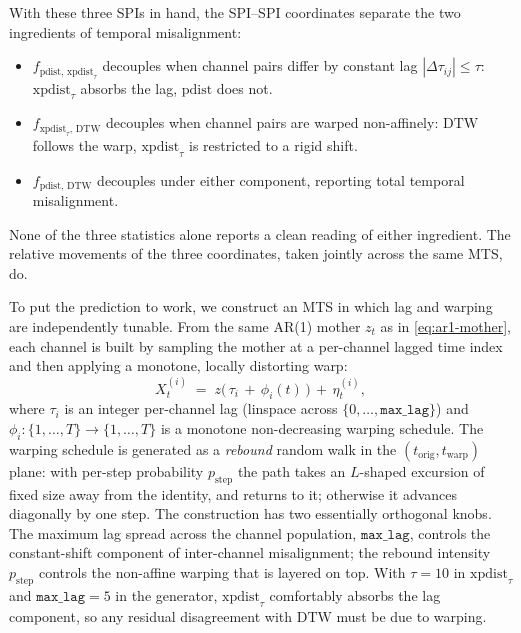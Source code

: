 \documentclass{article}
\theoremstyle{plain}
\theoremstyle{definition}
\theoremstyle{remark}
\begin{document}
With these three SPIs in hand, the SPI--SPI coordinates separate the two ingredients of temporal misalignment:
\begin{itemize}
\setlength{\itemsep}{0pt}\setlength{\parsep}{0pt}
\item[] $f_{\mathrm{pdist},\,\mathrm{xpdist}_\tau}$ decouples when channel pairs differ by constant lag $|\Delta\tau_{ij}| \le \tau$: $\mathrm{xpdist}_\tau$ absorbs the lag, $\mathrm{pdist}$ does not.
\item[] $f_{\mathrm{xpdist}_\tau,\,\mathrm{DTW}}$ decouples when channel pairs are warped non-affinely: $\mathrm{DTW}$ follows the warp, $\mathrm{xpdist}_\tau$ is restricted to a rigid shift.
\item[] $f_{\mathrm{pdist},\,\mathrm{DTW}}$ decouples under either component, reporting total temporal misalignment.
\end{itemize}
None of the three statistics alone reports a clean reading of either ingredient. The relative movements of the three coordinates, taken jointly across the same MTS, do.

To put the prediction to work, we construct an MTS in which lag and warping are independently tunable. From the same AR(1) mother $z_t$ as in \cref{eq:ar1-mother}, each channel is built by sampling the mother at a per-channel lagged time index and then applying a monotone, locally distorting warp:
\begin{equation}
X^{(i)}_t \;=\; z\bigl(\,\tau_i \,+\, \phi_i(t)\,\bigr) \,+\, \eta^{(i)}_t,
\end{equation}
where $\tau_i$ is an integer per-channel lag (linspace across $\{0,\dots,\texttt{max\_lag}\}$) and $\phi_i:\{1,\dots,T\}\to\{1,\dots,T\}$ is a monotone non-decreasing warping schedule. The warping schedule is generated as a \emph{rebound} random walk in the $(t_{\text{orig}},t_{\text{warp}})$ plane: with per-step probability $p_{\text{step}}$ the path takes an $L$-shaped excursion of fixed size away from the identity, and returns to it; otherwise it advances diagonally by one step. The construction has two essentially orthogonal knobs. The maximum lag spread across the channel population, $\texttt{max\_lag}$, controls the constant-shift component of inter-channel misalignment; the rebound intensity $p_{\text{step}}$ controls the non-affine warping that is layered on top. With $\tau=10$ in $\mathrm{xpdist}_\tau$ and $\texttt{max\_lag}=5$ in the generator, $\mathrm{xpdist}_\tau$ comfortably absorbs the lag component, so any residual disagreement with $\mathrm{DTW}$ must be due to warping.
\end{document}
